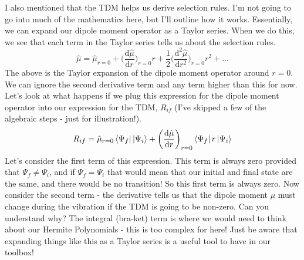 \documentclass{memoir}[11pt,oneside,a4paper,openany]
\newcommand{\dd}{\ensuremath{\mathrm{d}}}
\begin{document}
I also mentioned that the TDM helps us derive selection rules. I'm not going to go into much of the mathematics here, but I'll outline how it works. Essentially, we can expand our dipole moment operator as a Taylor series. When we do this, we see that each term in the Taylor series tells us about the selection rules.
\begin{equation}
	\hat{\mu} = \hat{\mu}_{r=0} + \bigg(\frac{\dd \hat{\mu}}{\dd r}\bigg)_{r=0} r + \frac{1}{2}\bigg(\frac{\dd^2 \hat{\mu}}{\dd r^2}\bigg)_{r=0} r^2 + ...
\end{equation}
The above is the Taylor expansion of the dipole moment operator around $r=0$. We can ignore the second derivative term and any term higher than this for now. Let's look at what happens if we plug this expression for the dipole moment operator into our expression for the TDM, $R_{if}$ (I've skipped a few of the algebraic steps - just for illustration!).
\begin{equation}
	R_{if} = \hat{\mu}_{r=0}\bra{\Psi_f}\ket{\Psi_i} + \bigg(\frac{\dd\hat{\mu}}{\dd r}\bigg)_{r=0} \bra{\Psi_f}r\ket{\Psi_i}
\end{equation}
Let's consider the first term of this expression. This term is always zero provided that $\Psi_f \ne \Psi_i$, and if $\Psi_f = \Psi_i$ that would mean that our initial and final state are the same, and there would be no transition! So this first term is always zero. Now consider the second term - the derivative tells us that the dipole moment $\mu$ must change during the vibration if the TDM is going to be non-zero. Can you understand why? The integral (bra-ket) term is where we would need to think about our Hermite Polynomials - this is too complex for here! Just be aware that expanding things like this as a Taylor series is a useful tool to have in our toolbox!
\end{document}
